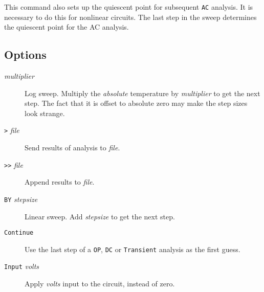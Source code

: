 This command also sets up the quiescent point for subsequent {\tt AC}
analysis.  It is necessary to do this for nonlinear circuits.  The last step
in the sweep determines the quiescent point for the AC analysis.
\subsection{Options}

\begin{description}

\item[{\tt *} {\it multiplier}] Log sweep.  Multiply the
{\em absolute} temperature by {\it multiplier} to get the
next step.  The fact that it is offset to absolute zero
may make the step sizes look strange.

\item[{\tt >} {\it file}] Send results of analysis to {\it file}.

\item[{\tt >>} {\it file}] Append results to {\it file}.



\item[{\tt BY} {\it stepsize}] Linear sweep.  Add {\it
stepsize} to get the next step.

\item[{\tt Continue}] Use the last step of a {\tt OP},
{\tt DC} or {\tt Transient} analysis as the first guess.



\item[{\tt Input} {\it volts}] Apply {\it volts} input to
the circuit, instead of zero.




\end{description}
